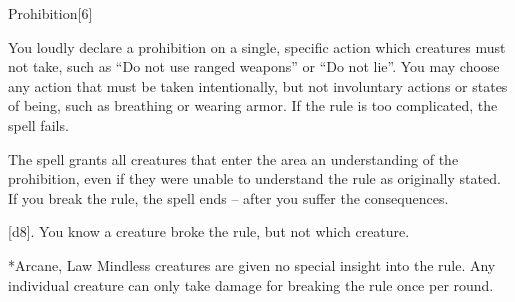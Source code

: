 \begin{spellsection}{Prohibition}[6]
    \begin{spellheader}
    \end{spellheader}
    \begin{spellcontent}
        \begin{spelltargetinginfo}
        \end{spelltargetinginfo}
        \begin{spelleffects}
            \spelleffect You loudly declare a prohibition on a single, specific action which creatures must not take, such as ``Do not use ranged weapons'' or ``Do not lie''. You may choose any action that must be taken intentionally, but not involuntary actions or states of being, such as breathing or wearing armor. If the rule is too complicated, the spell fails.

            The spell grants all creatures that enter the area an understanding of the prohibition, even if they were unable to understand the rule as originally stated. If you break the rule, the spell ends -- after you suffer the consequences.
            \spelldur \durshort
        \end{spelleffects}
    \end{spellcontent}
    \begin{spellsubcontent}
        \begin{spelltargetinginfo}
        \end{spelltargetinginfo}
        \begin{spelleffects}
            \spelleffect \spelldamage{}[d8]. You know a creature broke the rule, but not which creature.
        \end{spelleffects}
    \end{spellsubcontent}
    \begin{spellfooter}
        *{Arcane, Law}
        \spellnotes Mindless creatures are given no special insight into the rule. Any individual creature can only take damage for breaking the rule once per round.
        \miscastexplode
    \end{spellfooter}
\end{spellsection}

